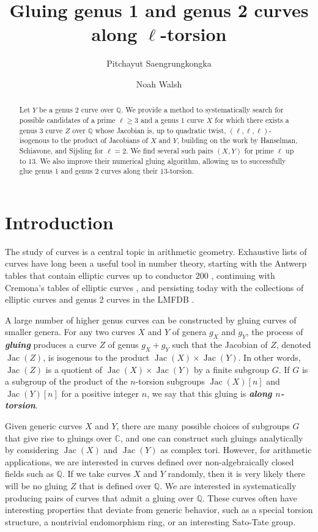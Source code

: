 \documentclass{amsproc}
\title{Gluing genus 1 and genus 2 curves along \texorpdfstring{$\ell$}{ℓ}-torsion}
\author{Pitchayut Saengrungkongka}
\author{Noah Walsh}
\numberwithin{equation}{section}
\theoremstyle{definition}
\theoremstyle{remark}
\newcommand{\vocab}[1]{\textbf{\textit{\boldmath #1}}}
\DeclareMathOperator{\Jac}{Jac}
\newcommand{\QQ}{\mathbb Q}
\newcommand{\CC}{\mathbb C}
\begin{document}
\begin{abstract}
    Let $Y$ be a genus $2$ curve over $\QQ$.
    We provide a method to systematically search for possible candidates of a prime $\ell\geq 3$ and a genus $1$ curve $X$ for which there exists a genus $3$ curve $Z$ over $\QQ$ whose Jacobian is, up to quadratic twist, $(\ell, \ell, \ell)$-isogenous to the product of Jacobians of $X$ and $Y$, building on the work by Hanselman, Schiavone, and Sijsling for $\ell=2$. We find several such pairs $(X,Y)$ for prime $\ell$ up to $13$. We also improve their numerical gluing algorithm, allowing us to successfully glue genus $1$ and genus $2$ curves along their $13$-torsion.
\end{abstract}
\maketitle
\section{Introduction}
The study of curves is a central topic in arithmetic geometry. Exhaustive lists of curves have long been a useful tool in number theory, starting with the Antwerp tables that contain elliptic curves up to conductor $200$ \cite{antwerp}, continuing with Cremona's tables of elliptic curves \cite{cremona_table}, and persisting today with the collections of elliptic curves and genus 2 curves in the LMFDB \cite{lmfdb}.

A large number of higher genus curves can be constructed by gluing curves of smaller genera. For any two curves $X$ and $Y$ of genera $g_X$ and $g_Y$, the process of \vocab{gluing} produces a curve $Z$ of genus $g_X+g_Y$ such that the Jacobian of $Z$, denoted $\Jac(Z)$, is isogenous to the product $\Jac(X)\times \Jac(Y)$. In other words, $\Jac(Z)$ is a quotient of $\Jac(X)\times\Jac(Y)$ by a finite subgroup $G$. If $G$ is a subgroup of the product of the $n$-torsion subgroups $\Jac(X)[n]$ and $\Jac(Y)[n]$ for a positive integer $n$, we say that this gluing is \vocab{along $n$-torsion}.

Given generic curves $X$ and $Y$, there are many possible choices of subgroups $G$ that give rise to gluings over $\CC$,
and one can construct such gluings analytically by considering $\Jac(X)$ and $\Jac(Y)$ as complex tori. However, for arithmetic applications, we are interested in curves defined over non-algebraically closed fields such as $\QQ$. If we take curves $X$ and $Y$ randomly, then it is very likely there will be no gluing $Z$ that is defined over $\QQ$. We are interested in systematically producing pairs of curves that admit a gluing over $\QQ$.
These curves often have interesting properties that deviate from generic behavior, such as a special torsion structure, a nontrivial endomorphism ring, or an interesting Sato-Tate group.
\end{document}
